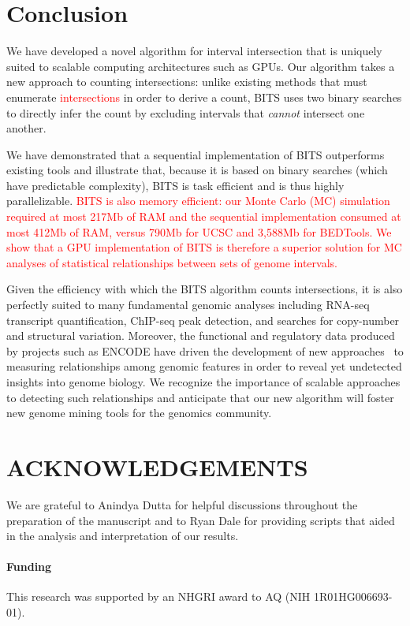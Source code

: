 \documentclass{bioinfo}
\begin{document}
\section{Conclusion}
We have developed a novel algorithm for interval intersection that
is uniquely suited to scalable computing architectures such as GPUs.
Our algorithm takes a new approach to counting intersections: 
unlike existing methods that must enumerate \textcolor{red}{intersections}
in order to derive a count, BITS uses two binary searches to directly infer the 
count by excluding intervals that \emph{cannot} intersect one another. 

We have demonstrated that a sequential implementation of BITS outperforms 
existing tools and illustrate that, because it is based on binary searches
(which have predictable complexity), BITS is task efficient and is thus highly 
parallelizable. \textcolor{red}{BITS is also memory efficient: our 
Monte Carlo (MC) simulation required at most 217Mb of RAM and the sequential 
implementation consumed at most 412Mb of RAM, versus 790Mb for UCSC and 
3,588Mb for BEDTools. We show that a GPU implementation 
of BITS is therefore a superior solution for MC analyses 
of statistical relationships between sets of genome intervals.}

Given the efficiency with which the BITS algorithm counts intersections,
it is also perfectly suited to many fundamental genomic analyses
including RNA-seq transcript quantification, ChIP-seq peak detection, and 
searches for copy-number and structural variation. Moreover, the 
functional and regulatory data produced by projects such as ENCODE
have driven the development of new approaches~\citep{favorov2012} 
to measuring relationships among genomic features in order to reveal yet 
undetected insights into genome biology. We recognize the importance of 
scalable approaches to detecting such relationships and anticipate that 
our new algorithm will foster new genome mining tools for the 
genomics community.
\vspace{-2em}
\section*{ACKNOWLEDGEMENTS}
We are grateful to Anindya Dutta for helpful discussions throughout the
preparation of the manuscript and to Ryan Dale for providing scripts that
aided in the analysis and interpretation of our results.

\paragraph{Funding\textcolon} This research was supported by an NHGRI award to AQ (NIH 1R01HG006693-01).
\vspace{-2em}
        
        
\end{document}
